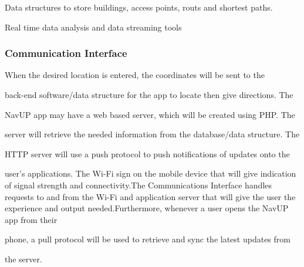 \documentclass[12pt]{article}
\begin{document}
{\raggedright

Data structures to store buildings, access points, routs and shortest paths.

}



{\raggedright

Real time data analysis and data streaming tools

}



\subsubsection{Communication Interface}

{\raggedright

When the desired location is entered, the coordinates will be sent to the

back-end software/data structure for the app to locate then give directions. The

NavUP app may have a web based server, which will be created using PHP. The

server will retrieve the needed information from the database/data structure. The

HTTP server will use a push protocol to push notifications of updates onto the

user's applications. The Wi-Fi sign on the mobile device that will give indication of signal strength and connectivity.The Communications Interface handles requests to and from the Wi-Fi and application server that will give the user the experience and output needed.Furthermore, whenever a user opens the NavUP app from their

phone, a pull protocol will be used to retrieve and sync the latest updates from

the server.

}
\end{document}
